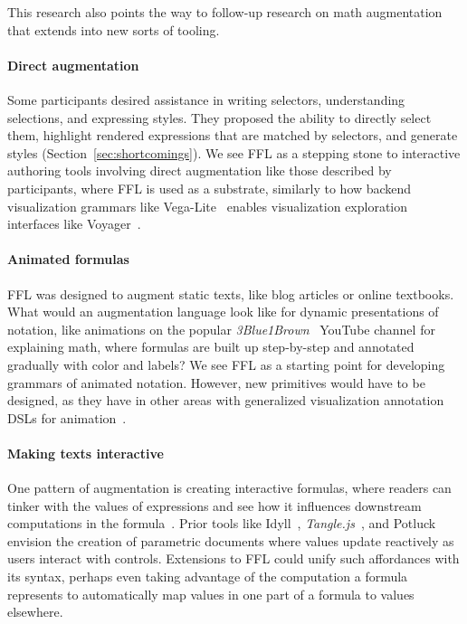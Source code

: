 \vspace{2.5ex}

This research also points the way to follow-up research on math augmentation that extends into new sorts of tooling.

\paragraph{Direct augmentation}
Some participants desired assistance in writing selectors, understanding selections, and expressing styles. They proposed the ability to directly select them, highlight rendered expressions that are matched by selectors, and generate styles (Section~\ref{sec:shortcomings}). We see FFL as a stepping stone to interactive authoring tools involving direct augmentation like those described by participants, where FFL is used as a substrate, similarly to how backend visualization grammars like Vega-Lite~\cite{ref:satyanarayan2017vegalite} enables visualization exploration interfaces like Voyager~\cite{ref:wongsuphasawat2015voyager}. 

\paragraph{Animated formulas}
FFL was designed to augment static texts, like blog articles or online textbooks. What would an augmentation language look like for dynamic presentations of notation, like animations on the popular \emph{3Blue1Brown}~\cite{ref:3Blue1Brown} YouTube channel for explaining math, where formulas are built up step-by-step and annotated gradually with color and labels? We see FFL as a starting point for developing grammars of animated notation. However, new primitives would have to be designed, as they have in other areas with generalized visualization annotation DSLs for animation~\cite{ref:ge2020canis}.

\paragraph{Making texts interactive}
One pattern of augmentation is creating interactive formulas, where readers can tinker with the values of expressions and see how it influences downstream computations in the formula~\cite{ref:head2022math}.
Prior tools like Idyll~\cite{ref:conlen2018idyll}, \emph{Tangle.js}~\cite{tool:victortangle}, and Potluck~\cite{ref:litt2022potluck} envision the creation of parametric documents where values update reactively as users interact with controls. Extensions to FFL could unify such affordances with its syntax, perhaps even taking advantage of the computation a formula represents to automatically map values in one part of a formula to values elsewhere.

